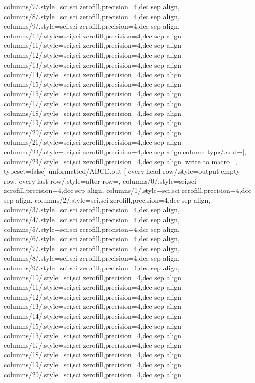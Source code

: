 columns/7/.style={sci,sci zerofill,precision=4,dec sep align},
columns/8/.style={sci,sci zerofill,precision=4,dec sep align},
columns/9/.style={sci,sci zerofill,precision=4,dec sep align},
columns/10/.style={sci,sci zerofill,precision=4,dec sep align},
columns/11/.style={sci,sci zerofill,precision=4,dec sep align},
columns/12/.style={sci,sci zerofill,precision=4,dec sep align},
columns/13/.style={sci,sci zerofill,precision=4,dec sep align},
columns/14/.style={sci,sci zerofill,precision=4,dec sep align},
columns/15/.style={sci,sci zerofill,precision=4,dec sep align},
columns/16/.style={sci,sci zerofill,precision=4,dec sep align},
columns/17/.style={sci,sci zerofill,precision=4,dec sep align},
columns/18/.style={sci,sci zerofill,precision=4,dec sep align},
columns/19/.style={sci,sci zerofill,precision=4,dec sep align},
columns/20/.style={sci,sci zerofill,precision=4,dec sep align},
columns/21/.style={sci,sci zerofill,precision=4,dec sep align},
columns/22/.style={sci,sci zerofill,precision=4,dec sep align,column type/.add={}{|}},
columns/23/.style={sci,sci zerofill,precision=4,dec sep align},
write to macro=\ABCD,
typeset=false]
{unformatted/ABCD.out}
\pgfplotstabletypeset[
every head row/.style={output empty row},
every last row/.style={after row={}},
columns/0/.style={sci,sci zerofill,precision=4,dec sep align},
columns/1/.style={sci,sci zerofill,precision=4,dec sep align},
columns/2/.style={sci,sci zerofill,precision=4,dec sep align},
columns/3/.style={sci,sci zerofill,precision=4,dec sep align},
columns/4/.style={sci,sci zerofill,precision=4,dec sep align},
columns/5/.style={sci,sci zerofill,precision=4,dec sep align},
columns/6/.style={sci,sci zerofill,precision=4,dec sep align},
columns/7/.style={sci,sci zerofill,precision=4,dec sep align},
columns/8/.style={sci,sci zerofill,precision=4,dec sep align},
columns/9/.style={sci,sci zerofill,precision=4,dec sep align},
columns/10/.style={sci,sci zerofill,precision=4,dec sep align},
columns/11/.style={sci,sci zerofill,precision=4,dec sep align},
columns/12/.style={sci,sci zerofill,precision=4,dec sep align},
columns/13/.style={sci,sci zerofill,precision=4,dec sep align},
columns/14/.style={sci,sci zerofill,precision=4,dec sep align},
columns/15/.style={sci,sci zerofill,precision=4,dec sep align},
columns/16/.style={sci,sci zerofill,precision=4,dec sep align},
columns/17/.style={sci,sci zerofill,precision=4,dec sep align},
columns/18/.style={sci,sci zerofill,precision=4,dec sep align},
columns/19/.style={sci,sci zerofill,precision=4,dec sep align},
columns/20/.style={sci,sci zerofill,precision=4,dec sep align},
